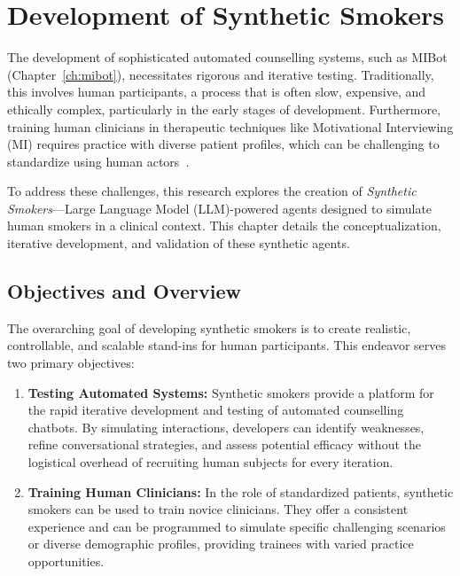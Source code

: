 \chapter{Development of Synthetic Smokers}
\label{ch:synthetic-smoker}

The development of sophisticated automated counselling systems, such as MIBot (Chapter~\ref{ch:mibot}), necessitates rigorous and iterative testing. Traditionally, this involves human participants, a process that is often slow, expensive, and ethically complex, particularly in the early stages of development. Furthermore, training human clinicians in therapeutic techniques like Motivational Interviewing (MI) requires practice with diverse patient profiles, which can be challenging to standardize using human actors~\citep{bickmore2007lessons}.

To address these challenges, this research explores the creation of \textit{Synthetic Smokers}—Large Language Model (LLM)-powered agents designed to simulate human smokers in a clinical context. This chapter details the conceptualization, iterative development, and validation of these synthetic agents.

\section{Objectives and Overview}
\label{sec:synthetic-smoker-goals}

The overarching goal of developing synthetic smokers is to create realistic, controllable, and scalable stand-ins for human participants. This endeavor serves two primary objectives:

\begin{enumerate}
    \item \textbf{Testing Automated Systems:} Synthetic smokers provide a platform for the rapid iterative development and testing of automated counselling chatbots. By simulating interactions, developers can identify weaknesses, refine conversational strategies, and assess potential efficacy without the logistical overhead of recruiting human subjects for every iteration.
    \item \textbf{Training Human Clinicians:} In the role of standardized patients, synthetic smokers can be used to train novice clinicians. They offer a consistent experience and can be programmed to simulate specific challenging scenarios or diverse demographic profiles, providing trainees with varied practice opportunities.
\end{enumerate}

